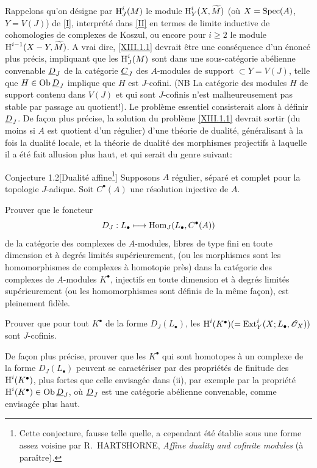 Rappelons qu'on d\'esigne par $\operatorname{H}^i_J (M)$ le module $\operatorname{H}^i_Y (X, \widetilde{M})$ (o\`u $X=\operatorname{Spec} (A)$, $Y=V(J)$) de \Exp \ref{I}, interpr\'et\'e dans \ref{II} en termes de limite inductive de cohomologies de complexes de Koszul, ou encore pour $i\ge 2$ le module $\operatorname{H}^{i-1} (X-Y, \widetilde{M})$. A vrai dire, \ref{XIII.1.1} devrait \^etre une cons\'equence d'un \'enonc\'e plus pr\'ecis, impliquant que les $\operatorname{H}^i_J ({M})$ sont dans une sous-cat\'egorie ab\'elienne convenable ${\underline{D}_J}$ de la cat\'egorie ${\underline{C}_J}$ des $A$-modules de support $\subset Y=V(J)$, telle que $H\in \operatorname{Ob} {\underline{D}_J}$ implique que $H$ est $J$-cofini. (NB La cat\'egorie des modules $H$ de support contenu dans $V(J)$ et qui sont $J$-cofinis n'est malheureusement pas stable par passage au quotient!). Le probl\`eme essentiel consisterait alors \`a d\'efinir ${\underline{D}_J}$. De fa\c con plus pr\'ecise, la solution du probl\`eme \ref{XIII.1.1} devrait sortir (du moins si $A$ est quotient d'un r\'egulier) d'une th\'eorie de dualit\'e, g\'en\'eralisant \`a la fois la dualit\'e locale, et la th\'eorie de dualit\'e des morphismes projectifs \`a laquelle il a \'et\'e fait allusion plus haut, et qui serait du genre suivant:

 \label{XIII.1.2}
\begin{enonce*}{Conjecture 1.2}[\og Dualit\'e affine\fg\footnote{Cette conjecture, fausse telle quelle, a cependant \'et\'e \'etablie sous une forme assez voisine par R.~HARTSHORNE, \emph{Affine duality and cofinite modules} (\`a para\^itre).}]
 Supposons $A$ r\'egulier, s\'epar\'e et complet pour la topologie $J$-adique. Soit $C^{\bullet}(A)$ une r\'esolution injective de $A$.
\begin{enumeratei}
\item
Prouver que le foncteur
$$D_J: L_{\bullet}\mto \Hom_J(L_{\bullet}, C^{\bullet}(A))$$
de la cat\'egorie des complexes de $A$-modules, libres de type fini en toute dimension et \`a degr\'es limit\'es sup\'erieurement, (ou les morphismes sont les homomorphismes de complexes \`a homotopie pr\`es) dans la cat\'egorie des complexes de $A$-modules $K^{\bullet}$, injectifs en toute dimension et \`a degr\'es limit\'es sup\'erieurement (ou les homomorphismes sont d\'efinis de la m\^eme fa\c con), est pleinement fid\`ele.

\item
Prouver que pour tout $K^{\bullet}$ de la forme $D_J(L_{\bullet})$, les $\operatorname{H}^i(K^{\bullet})(= \operatorname{Ext}_Y^i (X; L_{\bullet}, \mathscr{O}_X))$ sont $J$-cofinis.

\item
De fa\c con plus pr\'ecise, prouver que les $K^{\bullet}$ qui sont homotopes \`a un complexe de la forme $D_J(L_{\bullet})$ peuvent se caract\'eriser par des propri\'et\'es de finitude des $\operatorname{H}^i(K^{\bullet})$, plus fortes que celle envisag\'ee dans (ii), par exemple par la propri\'et\'e $\operatorname{H}^i(K^{\bullet})\in \operatorname{Ob} {\underline{D}_J}$, o\`u ${\underline{D}_J}$ est une cat\'egorie ab\'elienne convenable, comme envisag\'ee plus haut.
\end{enumeratei}
\end{enonce*}


